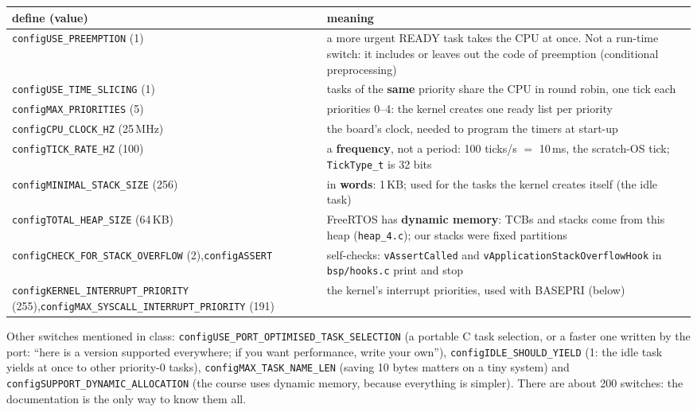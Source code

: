 \begin{center}
\footnotesize
\begin{tabular}{P{0.43} P{0.49}}
    \hline
    \textbf{define (value)} & \textbf{meaning} \\
    \hline
    \texttt{configUSE\_PREEMPTION} (1) & a more urgent READY task takes the CPU at once. Not a run-time switch: it includes or leaves out the code of preemption (conditional preprocessing) \\
    \texttt{configUSE\_TIME\_SLICING} (1) & tasks of the \textbf{same} priority share the CPU in round robin, one tick each \\
    \texttt{configMAX\_PRIORITIES} (5) & priorities 0--4: the kernel creates one ready list per priority \\
    \texttt{configCPU\_CLOCK\_HZ} (25\,MHz) & the board's clock, needed to program the timers at start-up \\
    \texttt{configTICK\_RATE\_HZ} (100) & a \textbf{frequency}, not a period: 100 ticks/s $=$ 10\,ms, the scratch-OS tick; \texttt{TickType\_t} is 32 bits \\
    \texttt{configMINIMAL\_STACK\_SIZE} (256) & in \textbf{words}: 1\,KB; used for the tasks the kernel creates itself (the idle task) \\
    \texttt{configTOTAL\_HEAP\_SIZE} (64\,KB) & FreeRTOS has \textbf{dynamic memory}: TCBs and stacks come from this heap (\texttt{heap\_4.c}); our stacks were fixed partitions \\
    \texttt{configCHECK\_FOR\_STACK\_OVERFLOW} (2),\newline \texttt{configASSERT} & self-checks: \texttt{vAssertCalled} and \texttt{vApplicationStackOverflowHook} in \texttt{bsp/hooks.c} print and stop \\
    \texttt{configKERNEL\_INTERRUPT\_PRIORITY} (255),\newline \texttt{configMAX\_SYSCALL\_INTERRUPT\_PRIORITY} (191) & the kernel's interrupt priorities, used with BASEPRI (below) \\
    \hline
\end{tabular}
\end{center}
Other switches mentioned in class: \texttt{configUSE\_PORT\_OPTIMISED\_TASK\_SELECTION} (a portable C task selection, or a faster one written by the port: ``here is a version supported everywhere; if you want performance, write your own''), \texttt{configIDLE\_SHOULD\_YIELD} (1: the idle task yields at once to other priority-0 tasks), \texttt{configMAX\_TASK\_NAME\_LEN} (saving 10 bytes matters on a tiny system) and \texttt{configSUPPORT\_DYNAMIC\_ALLOCATION} (the course uses dynamic memory, because everything is simpler). There are about 200 switches: the documentation is the only way to know them all.

